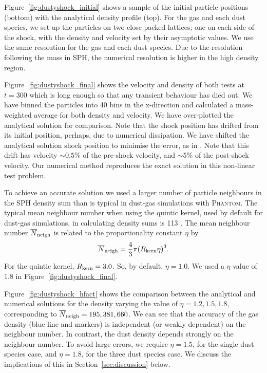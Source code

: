 \documentclass[fleqn,usenatbib]{mnras}
\begin{document}
Figure~\ref{fig:dustyshock_initial} shows a sample of the initial particle
positions (bottom) with the analytical density profile (top). For the gas and
each dust species, we set up the particles on two close-packed lattices; one on
each side of the shock, with the density and velocity set by their asymptotic
values. We use the same resolution for the gas and each dust species. Due to the
resolution following the mass in SPH, the numerical resolution is higher in the
high density region.

Figure~\ref{fig:dustyshock_final} shows the velocity and density of both tests
at \(t = 300\) which is long enough so that any transient behaviour has died
out. We have binned the particles into 40 bins in the x-direction and calculated
a mass-weighted average for both density and velocity. We have over-plotted the
analytical solution for comparison. Note that the shock position has drifted
from its initial position, perhaps, due to numerical dissipation. We have
shifted the analytical solution shock position to minimise the error, as in
\citet{Benitez-Llambay2019ApJS..241...25B}. Note that this drift has velocity
\(\sim 0.5\%\) of the pre-shock velocity, and \(\sim 5\%\) of the post-shock
velocity. Our numerical method reproduces the exact solution in this non-linear
test problem.

To achieve an accurate solution we used a larger number of particle neighbours
in the SPH density sum than is typical in dust-gas simulations with
\textsc{Phantom}. The typical mean neighbour number when using the quintic
kernel, used by default for dust-gas simulations, in calculating density sums is
113 \citep{Price2018PASA...35...31P}. The mean neighbour number
\(\overline{N}_{\rm neigh}\) is related to the proportionality constant \(\eta\)
by
%
\begin{align}
   \overline{N}_{\rm neigh} = \frac{4}{3} \pi
      {\left( R_{\rm kern} \eta \right)}^3.
\end{align}
%
For the quintic kernel, \( R_{\rm kern} = 3.0 \). So, by default, \(\eta =
1.0\). We used a \(\eta\) value of 1.8 in Figure~\ref{fig:dustyshock_final}.

Figure~\ref{fig:dustyshock_hfact} shows the comparison between the analytical
and numerical solutions for the density varying the value of \(\eta = 1.2, 1.5,
1.8\), corresponding to \(\overline{N}_{\rm neigh} = 195, 381, 660\). We can see
that the accuracy of the gas density (blue line and markers) is independent (or
weakly dependent) on the neighbour number. In contrast, the dust density depends
strongly on the neighbour number. To avoid large errors, we require \(\eta =
1.5\), for the single dust species case, and \(\eta = 1.8\), for the three dust
species case. We discuss the implications of this in
Section~\ref{sec:discussion} below.
\end{document}
